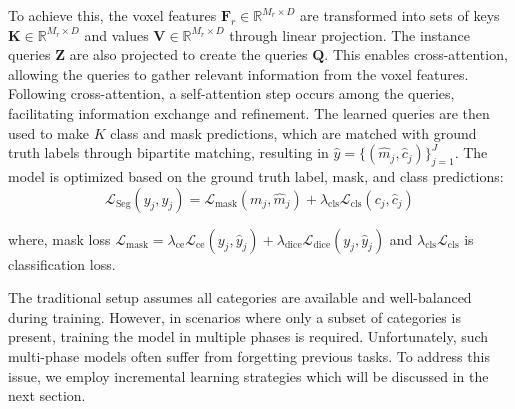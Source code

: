 To achieve this, the voxel features $\mathbf{F}_r \in \mathbb{R}^{M_{r} \times D}$ are transformed into sets of keys $\mathbf{K} \in \mathbb{R}^{M_{r} \times D}$ and values $\mathbf{V} \in \mathbb{R}^{M_{r} \times D}$ through linear projection. The instance queries $\mathbf{Z}$ are also projected to create the queries $\mathbf{Q}$. This enables cross-attention, allowing the queries to gather relevant information from the voxel features. Following cross-attention, a self-attention step occurs among the queries, facilitating information exchange and refinement. The learned queries are then used to make $K$ class and mask predictions, which are matched with ground truth labels through bipartite matching, resulting in $\hat{y} = \{(\hat{m}_j, \hat{c}_j)\}_{j=1}^J$. The model is optimized based on the ground truth label, mask, and class predictions:
\begin{equation}
\label{eq:detr_loss}
\mathcal{L}_\mathrm{Seg}(y_j, \hat{y}_j) = \mathcal{L}_\mathrm{mask}(m_j, \hat{m}_j) + \lambda_\mathrm{cls}\mathcal{L}_\mathrm{cls}(c_j, \hat{c}_j)
\end{equation}

where, mask loss $\mathcal{L}_\mathrm{mask} = \lambda_\mathrm{ce}\mathcal{L}_\mathrm{ce}(y_j, \hat{y}_j) + \lambda_\mathrm{dice}\mathcal{L}_\mathrm{dice}(y_j, \hat{y}_j)$ and $\lambda_\mathrm{cls}\mathcal{L}_\mathrm{cls}$ is classification loss.

The traditional setup assumes all categories are available and well-balanced during training. However, in scenarios where only a subset of categories is present, training the model in multiple phases is required. Unfortunately, such multi-phase models often suffer from forgetting previous tasks. To address this issue, we employ incremental learning strategies which will be discussed in the next section.

